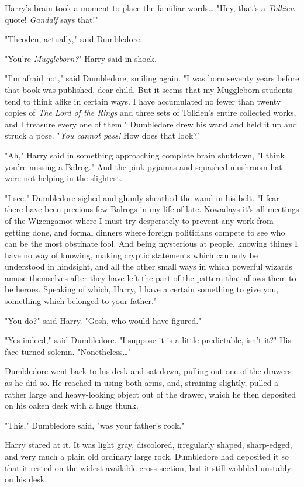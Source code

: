 Harry's brain took a moment to place the familiar words{\ldots} "Hey, that's a
\emph{Tolkien} quote! \emph{Gandalf} says that!"

"Theoden, actually," said Dumbledore.

"You're \emph{Muggleborn?}" Harry said in shock.

"I'm afraid not," said Dumbledore, smiling again. "I was born seventy years
before that book was published, dear child. But it seems that my Muggleborn
students tend to think alike in certain ways. I have accumulated no fewer than
twenty copies of \emph{The Lord of the Rings} and three sets of Tolkien's
entire collected works, and I treasure every one of them." Dumbledore drew his
wand and held it up and struck a pose. "\emph{You cannot pass!} How does that
look?"

"Ah," Harry said in something approaching complete brain shutdown, "I think
you're missing a Balrog." And the pink pyjamas and squashed mushroom hat were
not helping in the slightest.

"I see." Dumbledore sighed and glumly sheathed the wand in his belt. "I fear
there have been precious few Balrogs in my life of late. Nowadays it's all
meetings of the Wizengamot where I must try desperately to prevent any work
from getting done, and formal dinners where foreign politicians compete to see
who can be the most obstinate fool. And being mysterious at people, knowing
things I have no way of knowing, making cryptic statements which can only be
understood in hindsight, and all the other small ways in which powerful wizards
amuse themselves after they have left the part of the pattern that allows them
to be heroes. Speaking of which, Harry, I have a certain something to give you,
something which belonged to your father."

"You do?" said Harry. "Gosh, who would have figured."

"Yes indeed," said Dumbledore. "I suppose it is a little predictable, isn't
it?" His face turned solemn. "Nonetheless{\ldots}"

Dumbledore went back to his desk and sat down, pulling out one of the drawers
as he did so. He reached in using both arms, and, straining slightly, pulled a
rather large and heavy-looking object out of the drawer, which he then
deposited on his oaken desk with a huge thunk.

"This," Dumbledore said, "was your father's rock."

Harry stared at it. It was light gray, discolored, irregularly shaped,
sharp-edged, and very much a plain old ordinary large rock. Dumbledore had
deposited it so that it rested on the widest available cross-section, but it
still wobbled unstably on his desk.

